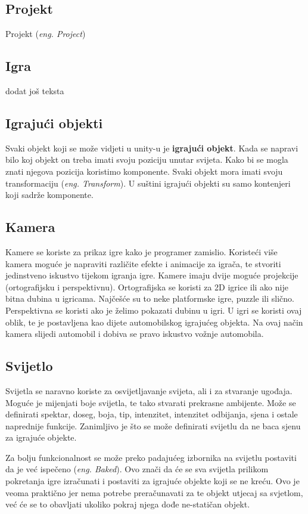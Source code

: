\subsection{Projekt}
Projekt (\emph{eng. Project})

\subsection{Igra}
dodat još teksta

\subsection{Igrajući objekti}
Svaki objekt koji se može vidjeti u unity-u je \textbf{igrajući objekt}. Kada se napravi bilo koj objekt on treba imati svoju poziciju unutar svijeta. Kako bi se mogla znati njegova pozicija koristimo komponente. Svaki objekt mora imati svoju transformaciju (\emph{eng. Transform}). U suštini igrajući objekti su samo kontenjeri koji sadrže komponente.

\subsection{Kamera}
Kamere se koriste za prikaz igre kako je programer zamislio. Koristeći više kamera moguće je napraviti različite efekte i animacije za igrača, te stvoriti jedinstveno iskustvo tijekom igranja igre. Kamere imaju dvije moguće projekcije (ortografijsku i perspektivnu). Ortografijska se koristi za 2D igrice ili ako nije bitna dubina u igricama. Najčešće su to neke platformske igre, puzzle ili slično. Perspektivna se koristi ako je želimo pokazati dubinu u igri. U igri se koristi ovaj oblik, te je postavljena kao dijete automobilskog igrajućeg objekta. Na ovaj način kamera slijedi automobil i dobiva se pravo iskustvo vožnje automobila.
\subsection{Svijetlo}
Svijetla se naravno koriste za osvijetljavanje svijeta, ali i za stvaranje ugođaja. Moguće je mijenjati boje svijetla, te tako stvarati prekrasne ambijente. Može se definirati spektar, doseg, boja, tip, intenzitet, intenzitet odbijanja, sjena i ostale naprednije funkcije. Zanimljivo je što se može definirati svijetlu da ne baca sjenu za igrajuće objekte. \par
Za bolju funkcionalnost se može preko padajućeg izbornika na svijetlu postaviti da je već ispečeno (\emph{eng. Baked}). Ovo znači da će se sva svijetla prilikom pokretanja igre izračunati i postaviti za igrajuće objekte koji se ne kreću. Ovo je veoma praktično jer nema potrebe preračunavati za te objekt utjecaj sa svjetlom, već će se to obavljati ukoliko pokraj njega dođe ne-statičan objekt.
